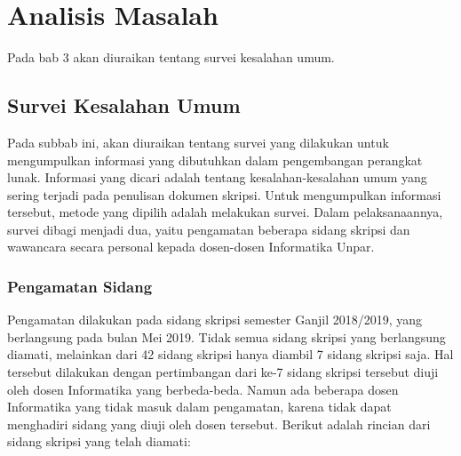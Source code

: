 \chapter{Analisis Masalah}
\label{chap:analisis}

Pada bab 3 akan diuraikan tentang survei kesalahan umum.

\section{Survei Kesalahan Umum}
\label{sec:survei}

Pada subbab ini, akan diuraikan tentang survei yang dilakukan untuk mengumpulkan informasi yang dibutuhkan dalam pengembangan perangkat lunak. Informasi yang dicari adalah tentang kesalahan-kesalahan umum yang sering terjadi pada penulisan dokumen skripsi. Untuk mengumpulkan informasi tersebut, metode yang dipilih adalah melakukan survei. Dalam pelaksanaannya, survei dibagi menjadi dua, yaitu pengamatan beberapa sidang skripsi dan wawancara secara personal kepada dosen-dosen Informatika Unpar. 

\subsection{Pengamatan Sidang}
Pengamatan dilakukan pada sidang skripsi semester Ganjil 2018/2019, yang berlangsung pada bulan Mei 2019. Tidak semua sidang skripsi yang berlangsung diamati, melainkan dari 42 sidang skripsi hanya diambil 7 sidang skripsi saja. Hal tersebut dilakukan dengan pertimbangan dari ke-7 sidang skripsi tersebut diuji oleh dosen Informatika yang berbeda-beda. Namun ada beberapa dosen Informatika yang tidak masuk dalam pengamatan, karena tidak dapat menghadiri sidang yang diuji oleh dosen tersebut. Berikut adalah rincian dari sidang skripsi yang telah diamati:

